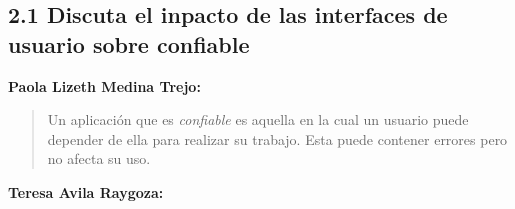 
\subsection*{2.1 Discuta el inpacto de las interfaces de usuario sobre confiable}

\textbf{Paola Lizeth Medina Trejo:}

\begin{quote}
  Un aplicación que es \textit{confiable} es aquella en la cual
un usuario puede depender de ella para realizar su trabajo. Esta
puede contener errores pero no afecta su uso.
\end{quote}

\textbf{Teresa Avila Raygoza:}


